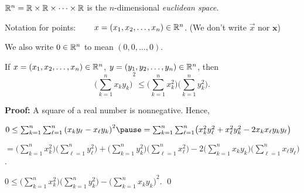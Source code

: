 \documentclass[10pt,aspectratio=169]{beamer}
\begin{document}
\begin{frame}
${\mathbb{R}}^n = {\mathbb{R}} \times {\mathbb{R}} \times \cdots \times {\mathbb{R}}$
is the
$n$-dimensional \emph{euclidean space}.

\pause
Notation for points: ~~~ $x =(x_1,x_2,\ldots,x_n) \in {\mathbb{R}}^n$.
\pause
\qquad (We don't write $\vec{x}$ nor $\mathbf{x}$)

\pause
We also write $0 \in {\mathbb{R}}^n$ to mean $(0,0,\ldots,0)$.

\pause

\begin{lemma}
If $x =(x_1,x_2,\ldots,x_n) \in {\mathbb{R}}^n$, $y =(y_1,y_2,\ldots,y_n) \in
{\mathbb{R}}^n$, then
\begin{equation*}
{\biggl( \sum_{k=1}^n x_k y_k \biggr)}^2
\leq
\biggl(\sum_{k=1}^n x_k^2 \biggr)
\biggl(\sum_{k=1}^n y_k^2 \biggr) .
\end{equation*}
\end{lemma}

\pause
\textbf{Proof:}
A square of a real number is nonnegative.
\pause
Hence,

\medskip

$
0
\leq 
\sum_{k=1}^n \sum_{\ell=1}^n {(x_k y_\ell - x_\ell y_k)}^2
\pause
=
\sum_{k=1}^n \sum_{\ell=1}^n
\bigl( x_k^2 y_\ell^2 + x_\ell^2 y_k^2 - 2 x_k x_\ell y_k y_\ell \bigr)
$

\pause
\medskip

\quad
$=
\biggl( \sum_{k=1}^n x_k^2 \biggr)
\biggl( \sum_{\ell=1}^n y_\ell^2 \biggr)
+
\biggl( \sum_{k=1}^n y_k^2 \biggr)
\biggl( \sum_{\ell=1}^n x_\ell^2 \biggr)
-
2
\biggl( \sum_{k=1}^n x_k y_k \biggr)
\biggl( \sum_{\ell=1}^n x_\ell y_\ell \biggr)$.

\pause
\medskip

\thus \quad 
$0 \leq 
\biggl( \sum_{k=1}^n x_k^2 \biggr)
\biggl( \sum_{k=1}^n y_k^2 \biggr)
-
{\biggl( \sum_{k=1}^n x_k y_k \biggr)}^2$.
\qed

\end{frame}
\end{document}
